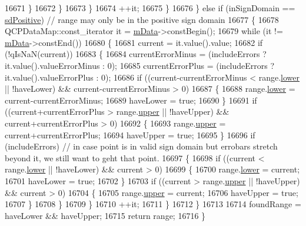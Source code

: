 \begin{DoxyCode}
16671           \}
16672         \}
16673       \}
16674       ++it;
16675     \}
16676   \} \textcolor{keywordflow}{else} \textcolor{keywordflow}{if} (inSignDomain == \hyperlink{class_q_c_p_abstract_plottable_a661743478a1d3c09d28ec2711d7653d8a02951859f243a4d24e779cfbb5471030}{sdPositive}) \textcolor{comment}{// range may only be in the positive sign domain}
16677   \{
16678     QCPDataMap::const\_iterator it = \hyperlink{class_q_c_p_graph_a8457c840f69a0ac49f61d30a509c5d08}{mData}->constBegin();
16679     \textcolor{keywordflow}{while} (it != \hyperlink{class_q_c_p_graph_a8457c840f69a0ac49f61d30a509c5d08}{mData}->constEnd())
16680     \{
16681       current = it.value().value;
16682       \textcolor{keywordflow}{if} (!qIsNaN(current))
16683       \{
16684         currentErrorMinus = (includeErrors ? it.value().valueErrorMinus : 0);
16685         currentErrorPlus = (includeErrors ? it.value().valueErrorPlus : 0);
16686         \textcolor{keywordflow}{if} ((current-currentErrorMinus < range.\hyperlink{class_q_c_p_range_aa3aca3edb14f7ca0c85d912647b91745}{lower} || !haveLower) && current-currentErrorMinus > 0)
16687         \{
16688           range.\hyperlink{class_q_c_p_range_aa3aca3edb14f7ca0c85d912647b91745}{lower} = current-currentErrorMinus;
16689           haveLower = \textcolor{keyword}{true};
16690         \}
16691         \textcolor{keywordflow}{if} ((current+currentErrorPlus > range.\hyperlink{class_q_c_p_range_ae44eb3aafe1d0e2ed34b499b6d2e074f}{upper} || !haveUpper) && current+currentErrorPlus > 0)
16692         \{
16693           range.\hyperlink{class_q_c_p_range_ae44eb3aafe1d0e2ed34b499b6d2e074f}{upper} = current+currentErrorPlus;
16694           haveUpper = \textcolor{keyword}{true};
16695         \}
16696         \textcolor{keywordflow}{if} (includeErrors) \textcolor{comment}{// in case point is in valid sign domain but errobars stretch beyond it, we
       still want to geht that point.}
16697         \{
16698           \textcolor{keywordflow}{if} ((current < range.\hyperlink{class_q_c_p_range_aa3aca3edb14f7ca0c85d912647b91745}{lower} || !haveLower) && current > 0)
16699           \{
16700             range.\hyperlink{class_q_c_p_range_aa3aca3edb14f7ca0c85d912647b91745}{lower} = current;
16701             haveLower = \textcolor{keyword}{true};
16702           \}
16703           \textcolor{keywordflow}{if} ((current > range.\hyperlink{class_q_c_p_range_ae44eb3aafe1d0e2ed34b499b6d2e074f}{upper} || !haveUpper) && current > 0)
16704           \{
16705             range.\hyperlink{class_q_c_p_range_ae44eb3aafe1d0e2ed34b499b6d2e074f}{upper} = current;
16706             haveUpper = \textcolor{keyword}{true};
16707           \}
16708         \}
16709       \}
16710       ++it;
16711     \}
16712   \}
16713   
16714   foundRange = haveLower && haveUpper;
16715   \textcolor{keywordflow}{return} range;
16716 \}
\end{DoxyCode}
\hypertarget{class_q_c_p_graph_a6a317cb14a83dae0841c7041a63d6d9d}{}
